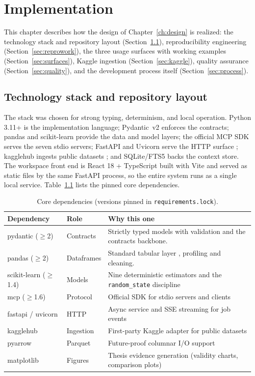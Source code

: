 \chapter{Implementation}
\label{ch:implementation}

This chapter describes how the design of Chapter~\ref{ch:design} is realized: the technology stack and repository layout (Section~\ref{sec:stack}), reproducibility engineering (Section~\ref{sec:reprowork}), the three usage surfaces with working examples (Section~\ref{sec:surfaces}), Kaggle ingestion (Section~\ref{sec:kaggle}), quality assurance (Section~\ref{sec:quality}), and the development process itself (Section~\ref{sec:process}).

\section{Technology stack and repository layout}
\label{sec:stack}

The stack was chosen for strong typing, determinism, and local operation. Python 3.11+ is the implementation language; Pydantic~v2 enforces the contracts; pandas and scikit-learn \cite{pedregosa2011sklearn} provide the data and model layers; the official MCP SDK \cite{mcp2024spec} serves the seven stdio servers; FastAPI and Uvicorn serve the HTTP surface \cite{fastapi2024}; kagglehub ingests public datasets \cite{kagglehub2024}; and SQLite/FTS5 \cite{sqlite2024fts5} backs the context store. The workspace front end is React 18 + TypeScript built with Vite and served as static files by the same FastAPI process, so the entire system runs as a single local service. Table~\ref{tab:stack} lists the pinned core dependencies.

\begin{table}[H]
\centering
\caption{Core dependencies (versions pinned in \texttt{requirements.lock}).}
\label{tab:stack}
\small
\begin{tabular}{llp{7.6cm}}
\toprule
\textbf{Dependency} & \textbf{Role} & \textbf{Why this one} \\
\midrule
pydantic ($\geq$2) & Contracts & Strictly typed models with validation and the contracts backbone. \\
pandas ($\geq$2) & Dataframes & Standard tabular layer \cite{mckinney2010pandas}, profiling and cleaning. \\
scikit-learn ($\geq$1.4) & Models & Nine deterministic estimators and the \texttt{random\_state} discipline \\
mcp ($\geq$1.6) & Protocol & Official SDK for stdio servers and clients \\
fastapi / uvicorn & HTTP & Async service and SSE streaming for job events \\
kagglehub & Ingestion & First-party Kaggle adapter for public datasets \\
pyarrow & Parquet & Future-proof columnar I/O support \\
matplotlib & Figures & Thesis evidence generation (validity charts, comparison plots) \\
\bottomrule
\end{tabular}
\end{table}


